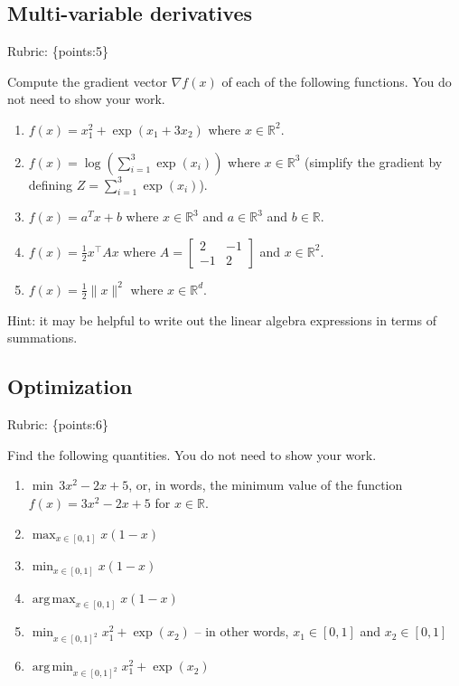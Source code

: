 \documentclass{article}
\def\rubric#1{\gre{Rubric: \{#1\}}}{}
\def\blu#1{{\color{blu}#1}}
\def\gre#1{{\color{gre}#1}}
\def\norm#1{\|#1\|}
\def\R{\mathbb{R}}
\DeclareMathOperator*\argmax{arg\,max}
\DeclareMathOperator*\argmin{arg\,min}
\def\half{\frac 1 2}
\begin{document}
	\subsection{Multi-variable derivatives}
	\label{sub.multi.var}
	\rubric{points:5}

	\blu{Compute the gradient vector $\nabla f(x)$ of each of the following functions.} You do not need to show your work.
	\begin{enumerate}
		\item $f(x) = x_1^2 + \exp(x_1 + 3x_2)$ where $x \in \R^2$.
		\item $f(x) = \log\left(\sum_{i=1}^3\exp(x_i)\right)$ where $x \in \R^3$ (simplify the gradient by defining $Z = \sum_{i=1}^3\exp(x_i)$).
		\item $f(x) = a^Tx + b$ where $x \in \R^3$ and $a \in \R^3$ and $b \in \R$.
		\item $f(x) = \half x^\top A x$ where $A=\left[ \begin{array}{cc}
			2 & -1 \\
			-1 & 2 \end{array} \right]$ and $x \in \mathbb{R}^2$.
		\item $f(x) = \frac{1}{2}\norm{x}^2$ where $x \in \R^d$.
	\end{enumerate}

	Hint: it may be helpful to write out the linear algebra expressions in terms of summations.


	\subsection{Optimization}
	\rubric{points:6}

	\blu{Find the following quantities.} You do not need to show your work.

	\begin{enumerate}
		\item $\min \, 3x^2-2x+5$, or, in words, the minimum value of the function $f(x) = 3x^2 -2x + 5$ for $x \in \R$.

		\item $\max_{x \in [0, 1]} x(1-x)$
		\item $\min_{x \in [0, 1]} x(1-x)$
		\item $\argmax_{x \in [0, 1]} x(1-x)$
		\item $\min_{x \in [0, 1]^2} x_1^2 + \exp(x_2)$ -- in other words, $x_1\in [0,1]$ and $x_2\in [0,1]$
		\item $\argmin_{x \in [0, 1]^2} x_1^2 + \exp(x_2)$
	\end{enumerate}
\end{document}
